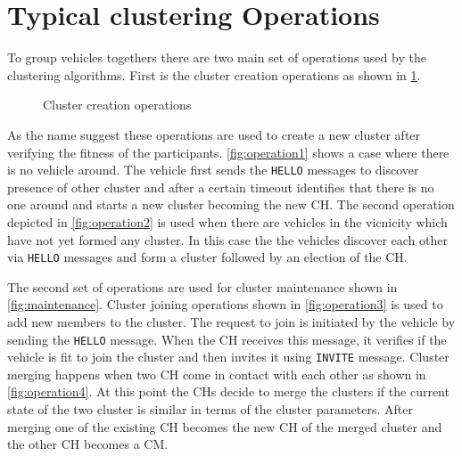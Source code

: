 \documentclass[]{ccs-thesis}
\begin{document}
\section{Typical clustering Operations}

To group vehicles togethers there are two main set of operations used by the clustering algorithms. First is the cluster creation operations
as shown in \cref{fig:creation}.

\begin{figure}[h]
    \centering
    \vfill%

    \caption{Cluster creation operations}
    \label{fig:creation}
\end{figure}

As the name suggest these operations are used to create a new cluster after verifying the fitness of the
participants. \cref{fig:operation1} shows a case where there is no vehicle around. The vehicle first sends the \texttt{HELLO} messages to
discover presence of other cluster and after a certain timeout identifies that there is no one around and starts a new cluster becoming the
new \ac{CH}. The second operation depicted in \cref{fig:operation2} is used when there are vehicles in the vicnicity which have not yet formed
any cluster. In this case the the vehicles discover each other via \texttt{HELLO} messages and form a cluster followed by an election of the
\ac{CH}.

The second set of operations are used for cluster maintenance shown in \cref{fig:maintenance}. Cluster joining operations shown in \cref{fig:operation3}
is used to add new members to the cluster. The request to join is initiated by the vehicle by sending the \texttt{HELLO} message. When the \ac{CH} receives
this message, it verifies if the vehicle is fit to join the cluster and then invites it using \texttt{INVITE} message. Cluster merging happens when two
\ac{CH} come in contact with each other as shown in \cref{fig:operation4}. At this point the \ac{CH}s decide to merge the clusters if the current state of
the two cluster is similar in terms of the cluster parameters. After merging one of the existing \ac{CH} becomes the new \ac{CH} of the merged cluster and
the other \ac{CH} becomes a \ac{CM}.
\end{document}
